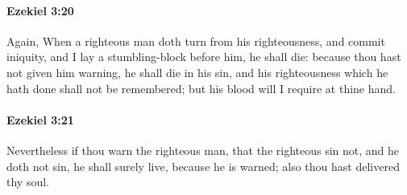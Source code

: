 		\paragraph{Ezekiel 3:20} %
			\label{EZEKIEL-3-20}

			Again, When a righteous man doth turn from his righteousness, and commit iniquity, and I lay a stumbling-block before him, he shall die: because thou hast not given him warning, he shall die in his sin, and his righteousness which he hath done shall not be remembered; but his blood will I require at thine hand.


		\paragraph{Ezekiel 3:21} %
			\label{EZEKIEL-3-21}

			Nevertheless if thou warn the righteous man, that the righteous sin not, and he doth not sin, he shall surely live, because he is warned; also thou hast delivered thy soul.

